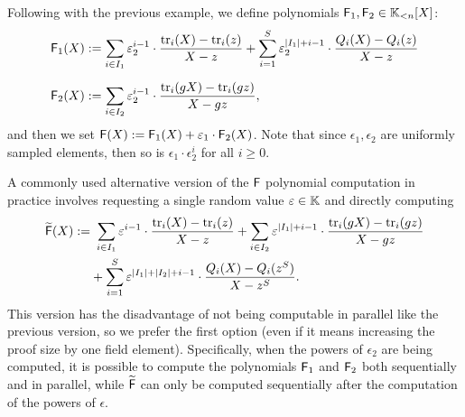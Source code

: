 Following with the previous example, we define polynomials $\textsf{F}_1,\textsf{F}_2 \in \mathbb{K}_{<n}[X]$:
\begin{align*}
\textsf{F}_1(X) &:= \sum_{i \in I_1} \varepsilon_2^{i-1} \cdot \frac{\text{tr}_i(X) - \text{tr}_i(z)}{X - z} + \sum_{i=1}^S \varepsilon_2^{|I_1|+i-1} \cdot \frac{Q_i(X) - Q_i(z)}{X - z} \\[0.2cm]
\textsf{F}_2(X) &:= \sum_{i \in I_2} \varepsilon_2^{i-1} \cdot \frac{\text{tr}_i(gX) - \text{tr}_i(gz)}{X - gz},
\end{align*}
and then we set $\textsf{F}(X) := \textsf{F}_1(X) + \varepsilon_1 \cdot \textsf{F}_2(X)$. Note that since $\epsilon_1,\epsilon_2$ are uniformly sampled elements, then so is $\epsilon_1 \cdot \epsilon_2^i$ for all $i \geq0$. 

A commonly used alternative version of the $\textsf{F}$ polynomial computation in practice involves requesting a single random value $\varepsilon \in \mathbb{K}$ and directly computing
\begin{align*}
\widetilde{\textsf{F}}(X) := &~\sum_{i \in I_1} \varepsilon^{i-1} \cdot \frac{\text{tr}_i(X) - \text{tr}_i(z)}{X - z} + \sum_{i \in I_2} \varepsilon^{|I_1|+i-1} \cdot \frac{\text{tr}_i(gX) - \text{tr}_i(gz)}{X - gz} \\
& + \sum_{i=1}^S \varepsilon^{|I_1|+|I_2|+i-1} \cdot \frac{Q_i(X) - Q_i(z^S)}{X - z^S}.
\end{align*}
This version has the disadvantage of not being computable in parallel like the previous version, so we prefer the first option (even if it means increasing the proof size by one field element). Specifically, when the powers of $\epsilon_2$ are being computed, it is possible to compute the polynomials $\textsf{F}_1$ and $\textsf{F}_2$ both sequentially and in parallel, while $\widetilde{\textsf{F}}$ can only be computed sequentially after the computation of the powers of $\epsilon$.